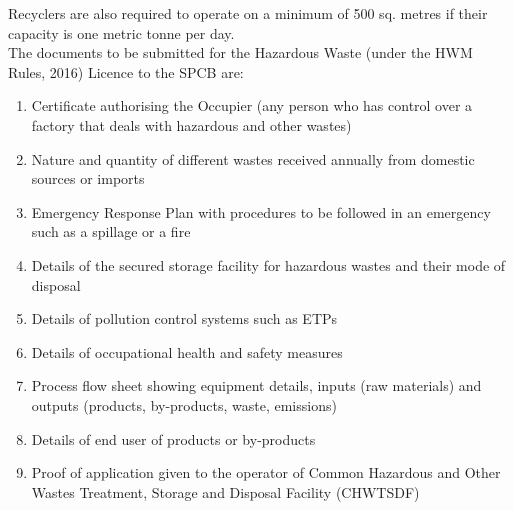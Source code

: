 \documentclass[a4paper, 12pt]{article}
\begin{document}
\begin{mdframed}[backgroundcolor=gray!20]
            Recyclers are also required to operate on a minimum of 500 sq. metres if their capacity is one metric tonne per day.\\
            
            The documents to be submitted for the Hazardous Waste (under the HWM Rules, 2016) Licence to the SPCB are:
        
        \begin{enumerate}
        	\item Certificate authorising the Occupier (any person who has control over a factory that deals with hazardous and other wastes)
        	\item Nature and quantity of different wastes received annually from domestic sources or imports
        	\item Emergency Response Plan with procedures to be followed in an emergency such as a spillage or a fire
        	\item Details of the secured storage facility for hazardous wastes and their mode of disposal
        	\item Details of pollution control systems such as ETPs
        	\item Details of occupational health and safety measures
        	\item Process flow sheet showing equipment details, inputs (raw materials) and outputs (products, by-products, waste, emissions)
        	\item Details of end user of products or by-products
        	\item Proof of application given to the operator of Common Hazardous and Other Wastes Treatment, Storage and Disposal Facility (CHWTSDF)
        
        \end{enumerate}
        
            \end{mdframed}
         
         
             \newpage       
\end{document}
